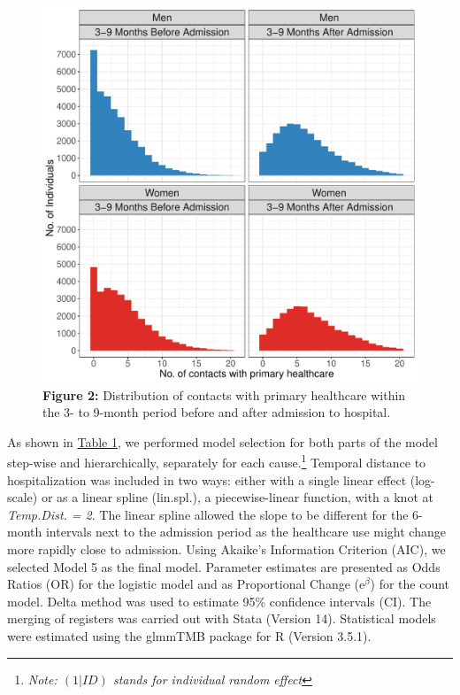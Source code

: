 	\begin{figure}[H]
		\centering
		\includegraphics[scale=0.6]{Paper_2/MAIN_Figure_2.pdf}
		\caption*{\textbf{Figure 2:} 	Distribution of contacts with primary 
										healthcare within the 3- to 9-month period 
										before and after admission to hospital.}
	\label{ch3:fig2}
	\end{figure}

As shown in \hyperref[ch3:tab1]{Table 1}, we performed model selection for both parts of the model 
step-wise and hierarchically, separately for each cause.\footnote{\textit{Note: 
$(1|ID)$ stands for individual random effect}} Temporal distance to hospitalization 
was included in two ways: either with a single linear effect (log-scale) or as 
a linear spline (lin.spl.), a piecewise-linear function, with a knot at \textit{Temp.Dist. = 2}. 
The linear spline allowed the slope to be different for the 6-month intervals next 
to the admission period as the healthcare use might change more rapidly close 
to admission. Using Akaike's Information Criterion (AIC), we selected Model 5 
as the final model. Parameter estimates are presented as Odds Ratios (OR) for 
the logistic model and as Proportional Change ($\mathrm{e}^\beta$) for the 
count model. Delta method was used to estimate 95\% confidence intervals (CI). 
The merging of registers was carried out with Stata (Version 14). Statistical 
models were estimated using the glmmTMB package for R (Version 3.5.1).\citep{brooks2017modeling} 


